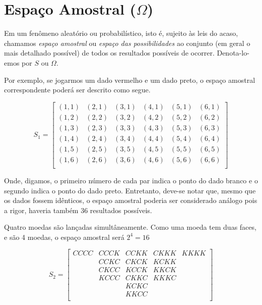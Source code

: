 \newpage
\section{Espaço Amostral ($\Omega$)}

Em um fenômeno aleatório ou probabilístico, isto é, sujeito às
leis do acaso, chamamos \emph{espaço amostral} ou \emph{espaço das
possibilidades} ao conjunto (em geral o mais detalhado possível)
de todos os resultados possíveis de ocorrer. Denota-lo-emos por
$S$ ou $\Omega$.\vskip0.3cm

Por exemplo, se jogarmos um dado vermelho e um dado preto, o
espaço amostral correspondente poderá ser descrito como segue.

$$
S_{1} =
\left[%
\begin{array}{cccccc}
  (1,1) & (2,1) & (3,1) & (4,1) & (5,1) & (6,1) \\
  (1,2) & (2,2) & (3,2) & (4,2) & (5,2) & (6,2) \\
  (1,3) & (2,3) & (3,3) & (4,3) & (5,3) & (6,3) \\
  (1,4) & (2,4) & (3,4) & (4,4) & (5,4) & (6,4) \\
  (1,5) & (2,5) & (3,5) & (4,5) & (5,5) & (6,5) \\
  (1,6) & (2,6) & (3,6) & (4,6) & (5,6) & (6,6) \\
\end{array}%
\right]
$$

Onde, digamos, o primeiro número de cada par indica o ponto do
dado branco e o segundo indica o ponto do dado preto. Entretanto, deve-se notar que, mesmo que os dados fossem
idênticos, o espaço amostral poderia ser considerado análogo pois
a rigor, haveria também 36 resultados possíveis.\vskip0.3cm


Quatro moedas são lançadas simultâneamente. Como uma moeda tem duas faces, e são 4 moedas, o espaço amostral será $2^{4}=16$ 

$$
S_{2} =
\left[%
\begin{array}{ccccc}
  CCCC  & CCCK  & CCKK  & CKKK  & KKKK \\
        & CCKC  & CKCK  & KCKK  &      \\
        & CKCC  & KCCK  & KKCK  &      \\
        & KCCC  & CKKC  & KKKC  &      \\
        &       & KCKC  &       &      \\
        &       & KKCC  &       &      \\
\end{array}%
\right]
$$

